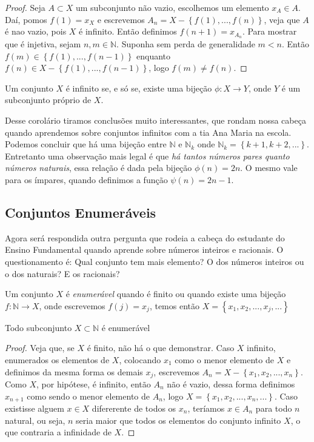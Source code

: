 \begin{proof}
Seja $A \subset X$ um subconjunto não vazio, escolhemos um elemento $x_{A} \in A$. Daí, pomos $f(1)=x_{X}$ e escrevemos $A_{n}=X-\left \{ f(1),...,f(n) \right \}$, veja que $A$ é nao vazio, pois $X$ é infinito. Então definimos $f(n+1)=x_{A_{n}}$. Para mostrar que é injetiva, sejam $n,m \in \mathbb{N}$. Suponha sem perda de generalidade $m < n$. Então $f(m) \in \left \{ f(1),...,f(n-1) \right \}$ enquanto $f(n) \in X-\left \{ f(1),...,f(n-1) \right \} $, logo $f(m) \neq f(n).$
\end{proof}

\begin{corol}
Um conjunto $X$ é infinito se, e só se, existe uma bijeção $\phi: X \rightarrow Y$, onde $Y$ é um subconjunto próprio de $X$.
\end{corol}

Desse corolário tiramos conclusões muito interessantes, que rondam nossa cabeça quando aprendemos sobre conjuntos infinitos com a tia Ana Maria na escola. Podemos concluir que há uma bijeção entre $\mathbb{N}$ e $\mathbb{N}_{k}$ onde $\mathbb{N}_{k}=\left \{k+1,k+2,... \right \}$. Entretanto uma observação mais legal é que \textit{há tantos números pares quanto números naturais}, essa relação é dada pela bijeção $\phi(n)=2n$. O mesmo vale para os ímpares, quando definimos a função $\psi(n)=2n-1$.

\subsection{Conjuntos Enumeráveis}
Agora será respondida outra pergunta que rodeia a cabeça do estudante do Ensino Fundamental quando aprende sobre números inteiros e racionais. O questionamento é: Qual conjunto tem mais elemento? O dos números inteiros ou o dos naturais? E os racionais?

Um conjunto $X$ é \textit{enumerável} quando é finito ou quando existe uma bijeção $f: \mathbb{N} \rightarrow X$, onde escrevemos $f(j)=x_{j}$, temos então $X=\left \{ x_{1},x_{2},...,x_{j},... \right \}$

\begin{theorem}
Todo subconjunto $X \subset \mathbb{N}$ é enumerável
\end{theorem}

\begin{proof}
Veja que, se $X$ é finito, não há o que demonstrar. Caso $X$ infinito, enumerados os elementos de $X$, colocando $x_{1}$ como o menor elemento de $X$ e definimos da mesma forma os demais $x_{j}$, escrevemos $A_{n}=X-\left \{ x_{1},x_{2},...,x_{n} \right \}$. Como $X$, por hipótese, é infinito, então $A_{n}$ não é vazio, dessa forma definimos $x_{n+1}$ como sendo o menor elemento de $A_{n}$, logo $X=\left \{ x_{1},x_{2},...,x_{n},... \right \}$. Caso existisse alguem $x \in X$ difererente de todos os $x_{n}$, teríamos $x \in A_{n}$ para todo $n$ natural, ou seja, $n$ seria maior que todos os elementos do conjunto infinito $X$, o que contraria a infinidade de $X$. 
\end{proof}


